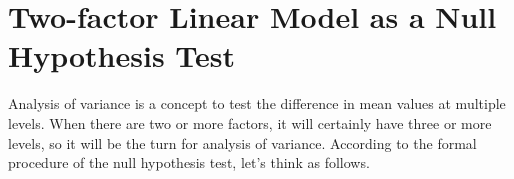 \documentclass{ltjsarticle}
\begin{document}
\section{Two-factor Linear Model as a Null Hypothesis Test}
Analysis of variance is a concept to test the difference in mean values at multiple levels. When there are two or more factors, it will certainly have three or more levels, so it will be the turn for analysis of variance. According to the formal procedure of the null hypothesis test, let's think as follows.
\end{document}
